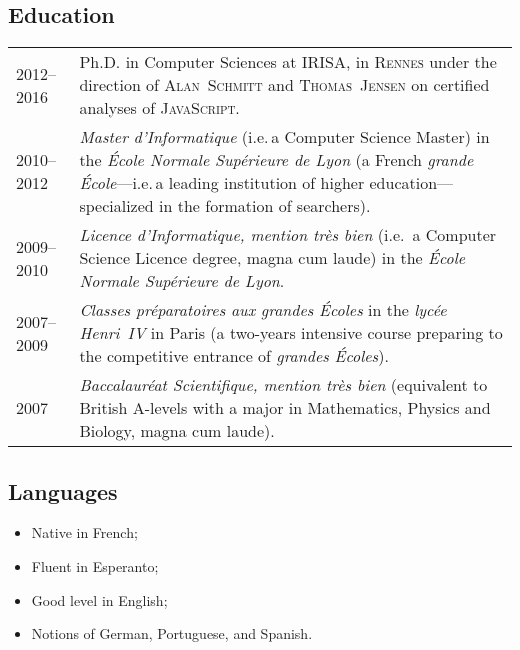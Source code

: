 \documentclass[12pt,a4paper]{article}
\makeatletter
\newcommand{\fr}[1]{\foreignlanguage{francais}{\textit{#1}}}
\newcommand{\ie}{i.e.\,}
\newenvironment{datecvsection}[1]%
               {\subsection*{#1}%
                 \noindent \begin{tabular}{@{}p{\annee}p{\texte}@{}}}
               {\end{tabular}}
\newenvironment{cvsection}[1]%
               {\subsection*{#1}}
               {}
\makeatother
\begin{document}
\begin{datecvsection}{Education}

	2012–2016 & Ph.D. in Computer Sciences at \textsc{IRISA}, in \textsc{Rennes} under the direction of \textsc{Alan~Schmitt} and \textsc{Thomas~Jensen} on certified analyses of \textsc{JavaScript}. \\

	2010–2012 & \fr{Master d’Informatique} (\ie a Computer Science
	Master) in the \fr{École Normale Supérieure de Lyon} (a French
	\fr{grande École}—\ie a leading institution of higher
    education—specialized in the formation of searchers). \\

	2009–2010 & \fr{Licence d’Informatique, mention très bien} (\ie
	a Computer Science Licence degree, magna cum laude) in the
	\fr{École Normale Supérieure de Lyon}. \\

	2007–2009 & \fr{Classes préparatoires aux grandes Écoles} in the
	\fr{lycée Henri~IV} in Paris (a two-years intensive course
	preparing to the competitive entrance of \fr{grandes Écoles}). \\

	2007 & \fr{Baccalauréat Scientifique, mention très bien}
	(equivalent to British A-levels with a major in Mathematics, Physics
	and Biology, magna cum laude). \\

\end{datecvsection}

\begin{cvsection}{Languages}
\parbox{.45\textwidth}{
\begin{itemize}
   \item Native in French;
   \item Fluent in Esperanto;
\end{itemize}}
\parbox{.45\textwidth}{
\begin{itemize}
   \item Good level in English;
   \item Notions of German, Portuguese, and Spanish.
\end{itemize}}
\end{cvsection}
\end{document}
